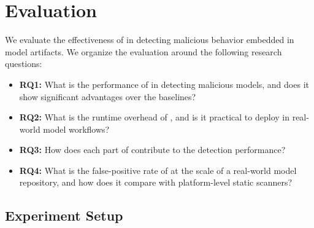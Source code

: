 \section{Evaluation}\label{sec:evaluation}

We evaluate the effectiveness of \toolname{} in detecting malicious behavior embedded in model artifacts. We organize the evaluation around the following research questions:

\begin{itemize}[noitemsep, topsep=1pt, partopsep=1pt, listparindent=\parindent, leftmargin=*]
    \item \textbf{RQ1:} What is the performance of \toolname{} in detecting malicious models, and does it show significant advantages over the baselines?
    \item \textbf{RQ2:} What is the runtime overhead of \toolname{}, and is it practical to deploy in real-world model workflows?
    \item \textbf{RQ3:} How does each part of \toolname{} contribute to the detection performance?
    \item \textbf{RQ4:} What is the false-positive rate of \toolname{} at the scale of a real-world model repository, and how does it compare with platform-level static scanners?
\end{itemize}


\subsection{Experiment Setup}

